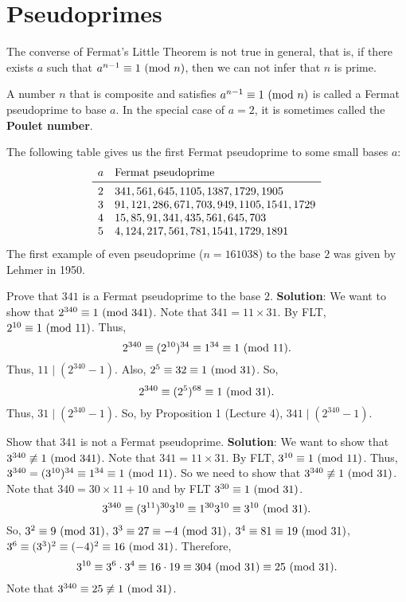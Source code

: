 \section{Pseudoprimes}
The converse of Fermat's Little Theorem is not true in general, that is, if
there exists $ a $ such that $ a^{n-1}\equiv 1\ (\mathrm{mod}\ n) $, then we can not infer that $ n $ is prime.
\begin{Definition}{}{}
    A number $ n $ that is composite and satisfies $ a^{n-1}\equiv 1\ (\mathrm{mod}\ n) $ is called a Fermat pseudoprime to base $ a $.
    In the special case of $ a=2 $, it is sometimes called the \textbf{Poulet number}.
\end{Definition}
\begin{Example}{}{}
    The following table gives us the first Fermat pseudoprime to some small bases $ a $:
    \[ \begin{array}{cl}
            a & \text{Fermat pseudoprime}             \\
            \midrule
            2 & 341,561,645,1105,1387,1729,1905       \\
            3 & 91,121,286,671,703,949,1105,1541,1729 \\
            4 & 15,85,91,341,435,561,645,703          \\
            5 & 4,124,217,561,781,1541,1729,1891
        \end{array} \]
    The first example of even pseudoprime ($n = 161038$) to the base $2$ was given
    by Lehmer in 1950.
\end{Example}
\begin{Example}{}{}
    Prove that $ 341 $ is a Fermat pseudoprime to the base $ 2 $.
    \tcblower{}
    \textbf{Solution}: We want to show that $ 2^{340}\equiv 1\ (\mathrm{mod}\ 341) $. Note that $ 341=11\times 31 $.
    By FLT, $ 2^{10}\equiv 1\ (\mathrm{mod}\ 11) $. Thus,
    \[ 2^{340}\equiv (2^{10})^{34}\equiv 1^{34}\equiv 1\ (\mathrm{mod}\ 11). \]
    Thus, $ 11\mid (2^{340}-1) $. Also, $ 2^5\equiv 32\equiv 1\ (\mathrm{mod}\ 31) $. So,
    \[ 2^{340}\equiv (2^5)^{68}\equiv 1\ (\mathrm{mod}\ 31). \]
    Thus, $ 31\mid (2^{340}-1) $. So, by Proposition 1 (Lecture 4), $ 341\mid (2^{340}-1) $.
\end{Example}
\begin{Exercise}{}{}
    Show that $ 341 $ is not a Fermat pseudoprime.
    \tcblower{}
    \textbf{Solution}: We want to show that $ 3^{340}\not\equiv 1\ (\mathrm{mod}\ 341) $. Note that $ 341=11\times 31 $.
    By FLT, $ 3^{10}\equiv 1\ (\mathrm{mod}\ 11) $. Thus, $ 3^{340}=(3^{10})^{34}\equiv 1^{34}\equiv 1\ (\mathrm{mod}\ 11) $.
    So we need to show that $ 3^{340}\not\equiv 1\ (\mathrm{mod}\ 31) $.
    Note that $ 340=30\times 11+10 $ and by FLT $ 3^{30}\equiv 1\ (\mathrm{mod}\ 31) $.
    \[ 3^{340}\equiv (3^{11})^{30}3^{10}\equiv 1^{30}3^{10}\equiv 3^{10}\ (\mathrm{mod}\ 31). \]
    So, $ 3^2\equiv 9\ (\mathrm{mod}\ 31) $, $ 3^3\equiv 27\equiv -4\ (\mathrm{mod}\ 31) $, $ 3^4\equiv 81\equiv 19\ (\mathrm{mod}\ 31) $, $ 3^6\equiv (3^3)^2\equiv (-4)^2\equiv 16\ (\mathrm{mod}\ 31) $.
    Therefore,
    \[ 3^{10}\equiv 3^6\cdot 3^4\equiv 16\cdot 19\equiv 304\ (\mathrm{mod}\ 31)\equiv 25\ (\mathrm{mod}\ 31).  \]
    Note that $ 3^{340}\equiv 25\not\equiv 1\ (\mathrm{mod}\ 31) $.
\end{Exercise}
